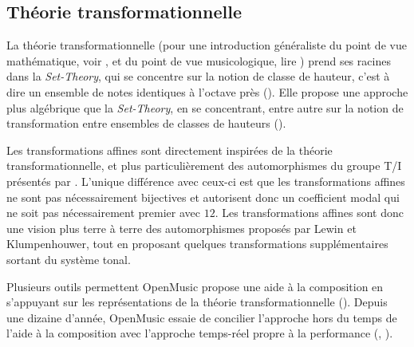 \subsection{Théorie transformationnelle}
\begin{comment}
\begin{enumerate}
  \item Les transformations affines sont une généralisation 
  \begin{enumerate}
    \item des Tonnetz
    \item des k-Nets
  \end{enumerate}
  \item ces transformations sont étudiées et utilisées surtout dans un contexte d'analyse et d'aide à la composition (OpenMusic)
\end{enumerate}
\end{comment}

La théorie transformationnelle (pour une introduction généraliste du point de vue mathématique, voir \cite{andreatta2008calcul}, et du point de vue musicologique, lire \cite{andreatta2014introduction}) prend ses racines dans la \emph{Set-Theory}, qui se concentre sur la notion de classe de hauteur, c'est à dire un ensemble de notes identiques à l'octave près (\cite{forte1973structure}). Elle propose une approche plus algébrique que la \emph{Set-Theory}, en se concentrant, entre autre sur la notion de transformation entre ensembles de classes de hauteurs (\cite{lewin1987generalized}).

Les transformations affines sont directement inspirées de la théorie transformationnelle, et plus particulièrement des automorphismes du groupe T/I présentés par \textcite{lewin1990klumpenhouwer}. L'unique différence avec ceux-ci est que les transformations affines ne sont pas nécessairement bijectives et autorisent donc un coefficient modal qui ne soit pas nécessairement premier avec $12$. Les transformations affines sont donc une vision plus terre à terre des automorphismes proposés par Lewin et Klumpenhouwer, tout en proposant quelques transformations supplémentaires sortant du système tonal.

Plusieurs outils permettent OpenMusic  propose une aide à la composition en s'appuyant sur les représentations de la théorie transformationnelle (\cite{andreatta2003formalisation}).   Depuis une dizaine d'année, OpenMusic essaie de concilier l'approche hors du temps de l'aide à la composition avec l'approche temps-réel propre à la performance (\cite{bresson2014reactive}, \cite{bresson2017next}).


